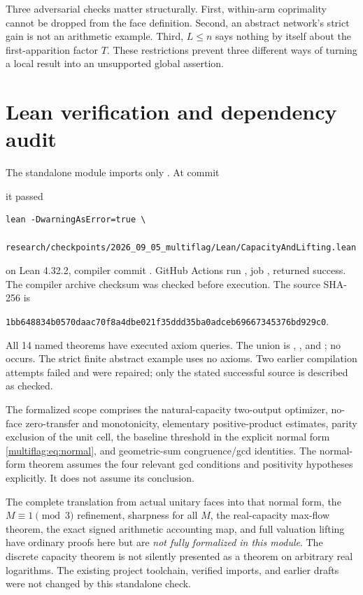 Three adversarial checks matter structurally. First, within-arm coprimality cannot be dropped from the face definition. Second, an abstract network's strict gain is not an arithmetic example. Third, \(L\le n\) says nothing by itself about the first-apparition factor \(T\). These restrictions prevent three different ways of turning a local result into an unsupported global assertion.

\section{Lean verification and dependency audit}\label{multiflag:sec:lean}
The standalone module  imports only . At commit
\begin{center}\end{center}
it passed
\begin{verbatim}
lean -DwarningAsError=true \
  research/checkpoints/2026_09_05_multiflag/Lean/CapacityAndLifting.lean
\end{verbatim}
on Lean 4.32.2, compiler commit . GitHub Actions run , job , returned success. The compiler archive checksum was checked before execution. The source SHA-256 is
\begin{center}\small\texttt{1bb648834b0570daac70f8a4dbe021f35ddd35ba0adceb69667345376bd929c0}.\end{center}

All 14 named theorems have executed axiom queries. The union is , , and ; no  occurs. The strict finite abstract example uses no axioms. Two earlier compilation attempts failed and were repaired; only the stated successful source is described as checked.

The formalized scope comprises the natural-capacity two-output optimizer, no-face zero-transfer and monotonicity, elementary positive-product estimates, parity exclusion of the unit cell, the baseline threshold in the explicit normal form \eqref{multiflag:eq:normal}, and geometric-sum congruence/gcd identities. The normal-form theorem assumes the four relevant gcd conditions and positivity hypotheses explicitly. It does not assume its conclusion.

The complete translation from actual unitary faces into that normal form, the \(M\equiv1\pmod3\) refinement, sharpness for all \(M\), the real-capacity max-flow theorem, the exact signed arithmetic accounting map, and full valuation lifting have ordinary proofs here but are \emph{not fully formalized in this module}. The discrete capacity theorem is not silently presented as a theorem on arbitrary real logarithms. The existing project toolchain, verified imports, and earlier drafts were not changed by this standalone check.

